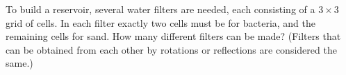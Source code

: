 To build a reservoir, several water filters are needed, each consisting of a $3\times3$ grid of cells. In each filter exactly two cells must be for bacteria, and the remaining cells for sand. How many different filters can be made? (Filters that can be obtained from each other by rotations or reflections are considered the same.)

